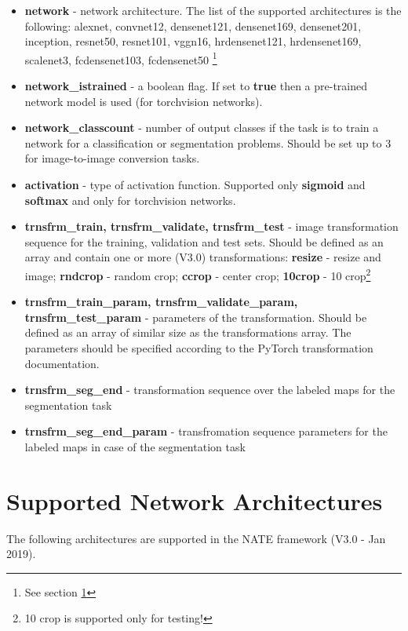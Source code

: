 \documentclass[a4paper, 11pt]{article}
\begin{document}
\begin{itemize}
    \item \textbf{network} - network architecture. The list of the supported architectures is the following:
    alexnet, convnet12, densenet121, densenet169, densenet201, inception, resnet50, resnet101, vggn16, hrdensenet121, hrdensenet169, scalenet3, fcdensenet103, fcdensenet50 \footnote{See section \ref{nnarch}}
    
    \item \textbf{network\_istrained} - a boolean flag. If set to \textbf{true} then a pre-trained network model is used (for torchvision networks). 
    
    \item \textbf{network\_classcount} - number of output classes if the task is to train a network for a classification or segmentation problems. Should be set up to 3 for image-to-image conversion tasks.
    
    \item \textbf{activation} - type of activation function. Supported only \textbf{sigmoid} and \textbf{softmax} and only for torchvision networks. 
    
    \item \textbf{trnsfrm\_train, trnsfrm\_validate, trnsfrm\_test} - image transformation sequence for the training, validation and test sets. Should be defined as an array and contain one or more (V3.0) transformations: \textbf{resize} - resize and image; \textbf{rndcrop} - random crop; \textbf{ccrop} - center crop; \textbf{10crop} - 10 crop\footnote{10 crop is supported only for testing!}
    
    \item \textbf{trnsfrm\_train\_param, trnsfrm\_validate\_param, trnsfrm\_test\_param} - parameters of the transformation. Should be defined as an array of similar size as the transformations array. The parameters should be specified according to the PyTorch transformation documentation.
	
	\item \textbf{trnsfrm\_seg\_end} - transformation sequence over the labeled maps for the segmentation task
	
	\item \textbf {trnsfrm\_seg\_end\_param} - transfromation sequence parameters for the labeled maps in case of the segmentation task
    
\end{itemize}



\section{Supported Network Architectures}
\label{nnarch}
The following architectures are supported in the NATE framework (V3.0 - Jan 2019).
\end{document}
